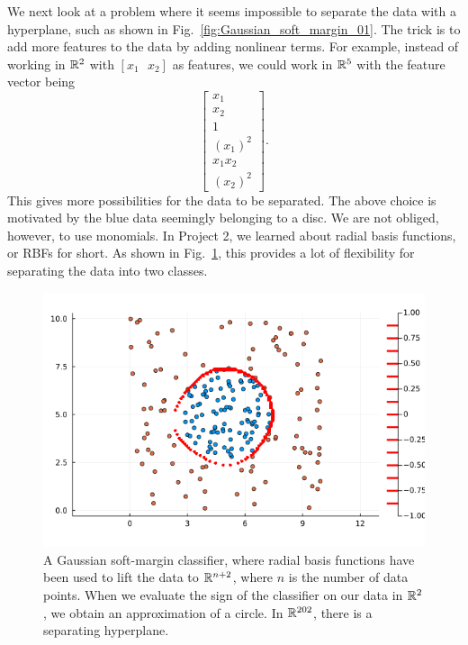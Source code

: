 We next look at a problem where it seems impossible to separate the data with a hyperplane, such as shown in Fig.~\ref{fig:Gaussian_soft_margin_01}. The trick is to add more features to the data by adding nonlinear terms. For example, instead of working in $\mathbb R^2$ with $[x_1~~~x_2]$ as features, we could work in $\mathbb R^5$ with the feature vector being
$$\left[\begin{array}{c} x_1\\ x_2\\ 1 \\ (x_1)^2 \\ x_1 x_2 \\ (x_2)^2 \end{array} \right]. $$
This gives more possibilities for the data to be separated. The above choice is motivated by the blue data seemingly belonging to a disc. We are not obliged, however, to use monomials. In Project 2, we learned about radial basis functions, or RBFs for short. As shown in Fig.~\ref{fig:Gaussian_soft_margin_02}, this provides a lot of flexibility for separating the data into two classes.

\begin{figure}[hb!]%
\centering
\includegraphics[width=0.95\columnwidth]{graphics/Chap13SeparatingHyperplanes/GaussiamSoftMargin02.png}%
\caption[]{A Gaussian soft-margin classifier, where radial basis functions have been used to lift the data to  $\mathbb R^{n+2}$, where $n$ is the number of data points. When we evaluate the sign of the classifier on our data in $\mathbb R^2$, we obtain an approximation of a circle. In $\mathbb R^{202}$, there is a separating hyperplane. }    
\label{fig:Gaussian_soft_margin_02}
\end{figure}



